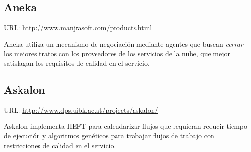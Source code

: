 \subsection{Aneka}
URL: \url{http://www.manjrasoft.com/products.html}

Aneka utiliza un mecanismo de negociación mediante agentes que buscan \emph{cerrar} los mejores tratos con los proveedores de los servicios de la nube, que mejor satisfagan los requisitos de calidad en el servicio.

 
\subsection{Askalon}
URL: \url{http://www.dps.uibk.ac.at/projects/askalon/}

Askalon implementa HEFT para calendarizar flujos que requieran reducir tiempo de ejecución y algoritmos genéticos para trabajar flujos de trabajo con restricciones de calidad en el servicio.